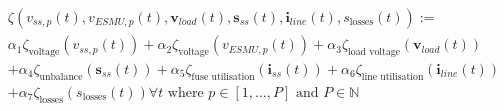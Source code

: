 
\begin{multline}
	\zeta(v_{ss,p}(t), v_{ESMU,p}(t), \textbf{v}_{load}(t), \textbf{s}_{ss}(t), \textbf{i}_{line}(t), s_\text{losses}(t)) :=\\
	\alpha_1 \zeta_\text{voltage}(v_{ss,p}(t))%
	+ \alpha_2 \zeta_\text{voltage}(v_{ESMU,p}(t))%
	+ \alpha_3 \zeta_\text{load voltage}(\textbf{v}_{load}(t))\\
	+ \alpha_4 \zeta_\text{unbalance}(\textbf{s}_{ss}(t))%
	+ \alpha_5 \zeta_\text{fuse utilisation}(\textbf{i}_{ss}(t))%
	+ \alpha_6 \zeta_\text{line utilisation}(\textbf{i}_{line}(t))\\
	+ \alpha_7 \zeta_\text{losses}(s_\text{losses}(t))%
	 \forall t \text{ where } p \in [1, \dots, P] \text{ and } P \in \mathbb{N}
\label{ch1:equ:weighted-sum-cost-function}
\end{multline}
